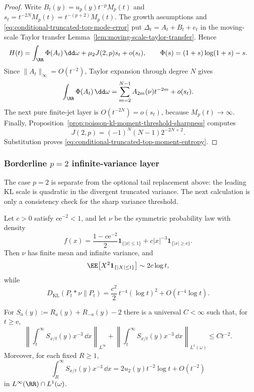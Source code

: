 \begin{proof}
Write \(B_t(y)=u_p(y)t^{-p}M_p(t)\) and
\(s_t=t^{-2N}M_p(t)=t^{-(p+2)}M_p(t)\).  The growth assumptions and
\eqref{eq:conditional-truncated-top-mode-error} put
\(\Delta_t=A_t+B_t+e_t\) in the moving-scale Taylor transfer
Lemma~\ref{lem:moving-scale-taylor-transfer}.  Hence
\[
  H(t)=\int_{\RR}\Phi(A_t)\,\dd\omega+\mu_2J(2,p)s_t+o(s_t),
  \qquad
  \Phi(s)=(1+s)\log(1+s)-s .
\]
Since \(\|A_t\|_\infty=O(t^{-2})\), Taylor expansion through degree \(N\)
gives
\[
  \int_{\RR}\Phi(A_t)\,\dd\omega
  =
  \sum_{m=2}^{N-1}A_{2m}(\nu)t^{-2m}+o(s_t).
\]
The next pure finite-jet layer is \(O(t^{-2N})=o(s_t)\), because
\(M_p(t)\to\infty\).  Finally,
Proposition~\ref{prop:poisson-kl-moment-threshold-sharpness} computes
\[
J(2,p)=(-1)^N(N-1)2^{-2N+2}.
\]
Substitution proves \eqref{eq:conditional-truncated-top-moment-entropy}.
\end{proof}

\subsubsection*{Borderline \(p=2\) infinite-variance layer}\leavevmode\par\smallskip

The case \(p=2\) is separate from the optional tail replacement above: the
leading KL scale is quadratic in the divergent truncated variance.  The next
calculation is only a consistency check for the sharp variance threshold.

\begin{theorem}%
\label{prop:n2-borderline-infinite-variance-layer}
Let \(c>0\) satisfy \(c\mathrm e^{-2}<1\), and let \(\nu\) be the symmetric
probability law with density
\[
f(x)=\frac{1-c\mathrm e^{-2}}{2}\mathbf1_{\{|x|\le1\}}
      +c|x|^{-3}\mathbf1_{\{|x|\ge \mathrm e\}} .
\]
Then \(\nu\) has finite mean and infinite variance, and
\[
\EE\!\left[X^2\mathbf1_{\{|X|\le t\}}\right]\sim 2c\log t,
\]
while
\[
D_{\mathrm{KL}}(P_t*\nu\|P_t)
=\frac{c^2}{2}\,t^{-4}(\log t)^2+O(t^{-4}\log t).
\]
\end{theorem}

\begin{lemma}[Symmetric \(p=2\) quotient tail split]
\label{lem:symmetric-p2-far-tail-quotient}
For \(S_a(y):=R_a(y)+R_{-a}(y)-2\) there is a universal \(C<\infty\) such
that, for \(t\ge\mathrm e\),
\begin{equation}\label{eq:symmetric-p2-far-tail-quotient}
  \left\|
  \int_t^\infty S_{x/t}(y)x^{-3}\,\dd x
  \right\|_{L^\infty}
  +
  \left\|
  \int_t^\infty S_{x/t}(y)x^{-3}\,\dd x
  \right\|_{L^1(\omega)}
  \le Ct^{-2}.
\end{equation}
Moreover, for each fixed \(R\ge1\),
\begin{equation}\label{eq:symmetric-p2-full-tail-split}
\int_R^\infty S_{x/t}(y)x^{-3}\,\dd x
=2u_2(y)t^{-2}\log t+O(t^{-2})
\end{equation}
in \(L^\infty(\RR)\cap L^1(\omega)\).
\end{lemma}

